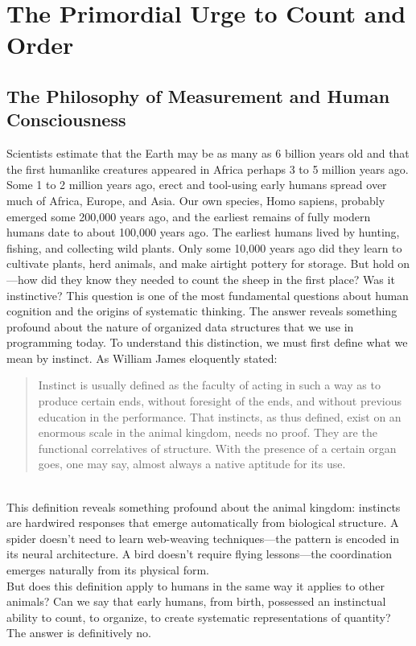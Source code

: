 
\chapter{The Primordial Urge to Count and Order}

\section{The Philosophy of Measurement and Human Consciousness}
Scientists estimate that the Earth may be as many as 6 billion years old and that the first humanlike creatures appeared in Africa perhaps 3 to 5 million years ago. Some 1 to 2 million years ago, erect and tool-using early humans spread over much of Africa, Europe, and Asia. Our own species, Homo sapiens, probably emerged some 200,000 years ago, and the earliest remains of fully modern humans date to about 100,000 years ago. The earliest humans lived by hunting, fishing, and collecting wild plants. Only some 10,000 years ago did they learn to cultivate plants, herd animals, and make airtight pottery for storage. But hold on—how did they know they needed to count the sheep in the first place? Was it instinctive?
This question is one of the most fundamental questions about human cognition and the origins of systematic thinking. The answer reveals something profound about the nature of organized data structures that we use in programming today. To understand this distinction, we must first define what we mean by instinct. As William James eloquently stated:
\begin{quote}
	Instinct is usually defined as the faculty of acting in such a way as to produce certain ends, without foresight of the ends, and without previous education in the performance. That instincts, as thus defined, exist on an enormous scale in the animal kingdom, needs no proof. They are the functional correlatives of structure. With the presence of a certain organ goes, one may say, almost always a native aptitude for its use.
\end{quote}
\\
This definition reveals something profound about the animal kingdom: instincts are hardwired responses that emerge automatically from biological structure. A spider doesn't need to learn web-weaving techniques—the pattern is encoded in its neural architecture. A bird doesn't require flying lessons—the coordination emerges naturally from its physical form.\\
But does this definition apply to humans in the same way it applies to other animals? Can we say that early humans, from birth, possessed an instinctual ability to count, to organize, to create systematic representations of quantity? The answer is definitively no.

